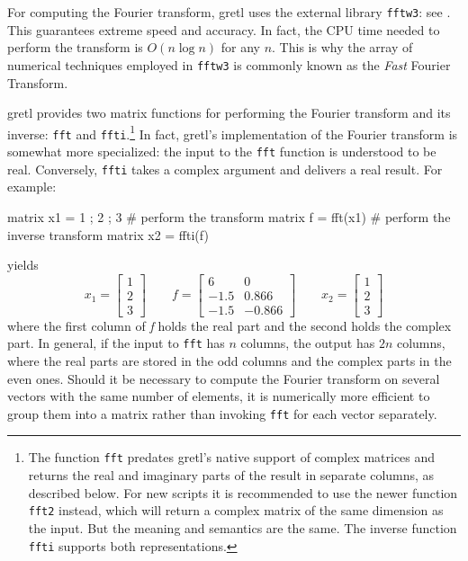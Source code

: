 For computing the Fourier transform, gretl uses the external
library \texttt{fftw3}: see \cite{frigo05}. This guarantees
extreme speed and accuracy. In fact, the CPU time needed to perform
the transform is $O(n \log n)$ for any $n$. This is why the array of
numerical techniques employed in \texttt{fftw3} is commonly known as
the \emph{Fast} Fourier Transform.

gretl provides two matrix functions for performing the Fourier transform
and its inverse: \texttt{fft} and \texttt{ffti}.\footnote{The function 
\texttt{fft} predates gretl's native support of complex matrices and 
returns the real and imaginary parts of the result in separate columns,
as described below. For new scripts it is recommended to use the newer
function \texttt{fft2} instead, which will return a complex matrix of 
the same dimension as the input. But the meaning and semantics are the 
same. The inverse function \texttt{ffti} supports both representations.}
In fact, gretl's
implementation of the Fourier transform is somewhat more specialized:
the input to the \texttt{fft} function is understood to be real.
Conversely, \texttt{ffti} takes a complex argument and delivers a real
result. For example:
\begin{code}
matrix x1 = { 1 ; 2 ; 3 }
# perform the transform
matrix f = fft(x1)
# perform the inverse transform
matrix x2 = ffti(f)
\end{code}
yields
\[
  x_1 = \left[ \begin{array}{c} 1 \\ 2 \\ 3 \end{array} \right]
  \qquad
  f = \left[ \begin{array}{rr}
      6 & 0 \\ -1.5 & 0.866 \\ -1.5 & -0.866
   \end{array} \right]
  \qquad
  x_2 = \left[ \begin{array}{c} 1 \\ 2 \\ 3 \end{array} \right]
\]
where the first column of \emph{f} holds the real part and the second
holds the complex part. In general, if the input to \texttt{fft} has
$n$ columns, the output has $2n$ columns, where the real parts are
stored in the odd columns and the complex parts in the even
ones. Should it be necessary to compute the Fourier transform on
several vectors with the same number of elements, it is numerically more
efficient to group them into a matrix rather than invoking
\texttt{fft} for each vector separately.

